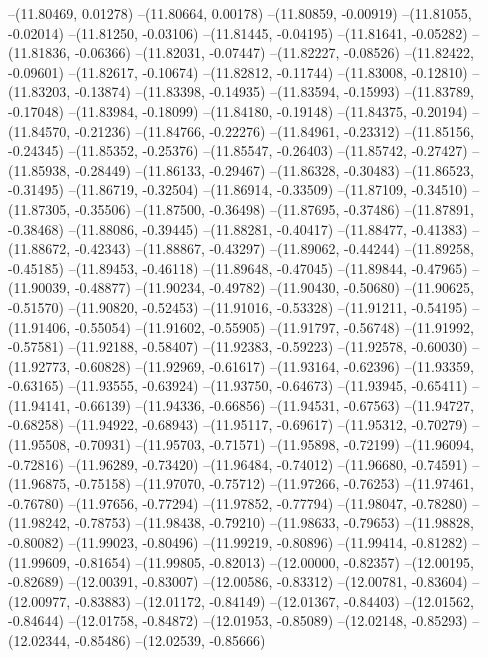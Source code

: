 --(11.80469, 0.01278)
--(11.80664, 0.00178)
--(11.80859, -0.00919)
--(11.81055, -0.02014)
--(11.81250, -0.03106)
--(11.81445, -0.04195)
--(11.81641, -0.05282)
--(11.81836, -0.06366)
--(11.82031, -0.07447)
--(11.82227, -0.08526)
--(11.82422, -0.09601)
--(11.82617, -0.10674)
--(11.82812, -0.11744)
--(11.83008, -0.12810)
--(11.83203, -0.13874)
--(11.83398, -0.14935)
--(11.83594, -0.15993)
--(11.83789, -0.17048)
--(11.83984, -0.18099)
--(11.84180, -0.19148)
--(11.84375, -0.20194)
--(11.84570, -0.21236)
--(11.84766, -0.22276)
--(11.84961, -0.23312)
--(11.85156, -0.24345)
--(11.85352, -0.25376)
--(11.85547, -0.26403)
--(11.85742, -0.27427)
--(11.85938, -0.28449)
--(11.86133, -0.29467)
--(11.86328, -0.30483)
--(11.86523, -0.31495)
--(11.86719, -0.32504)
--(11.86914, -0.33509)
--(11.87109, -0.34510)
--(11.87305, -0.35506)
--(11.87500, -0.36498)
--(11.87695, -0.37486)
--(11.87891, -0.38468)
--(11.88086, -0.39445)
--(11.88281, -0.40417)
--(11.88477, -0.41383)
--(11.88672, -0.42343)
--(11.88867, -0.43297)
--(11.89062, -0.44244)
--(11.89258, -0.45185)
--(11.89453, -0.46118)
--(11.89648, -0.47045)
--(11.89844, -0.47965)
--(11.90039, -0.48877)
--(11.90234, -0.49782)
--(11.90430, -0.50680)
--(11.90625, -0.51570)
--(11.90820, -0.52453)
--(11.91016, -0.53328)
--(11.91211, -0.54195)
--(11.91406, -0.55054)
--(11.91602, -0.55905)
--(11.91797, -0.56748)
--(11.91992, -0.57581)
--(11.92188, -0.58407)
--(11.92383, -0.59223)
--(11.92578, -0.60030)
--(11.92773, -0.60828)
--(11.92969, -0.61617)
--(11.93164, -0.62396)
--(11.93359, -0.63165)
--(11.93555, -0.63924)
--(11.93750, -0.64673)
--(11.93945, -0.65411)
--(11.94141, -0.66139)
--(11.94336, -0.66856)
--(11.94531, -0.67563)
--(11.94727, -0.68258)
--(11.94922, -0.68943)
--(11.95117, -0.69617)
--(11.95312, -0.70279)
--(11.95508, -0.70931)
--(11.95703, -0.71571)
--(11.95898, -0.72199)
--(11.96094, -0.72816)
--(11.96289, -0.73420)
--(11.96484, -0.74012)
--(11.96680, -0.74591)
--(11.96875, -0.75158)
--(11.97070, -0.75712)
--(11.97266, -0.76253)
--(11.97461, -0.76780)
--(11.97656, -0.77294)
--(11.97852, -0.77794)
--(11.98047, -0.78280)
--(11.98242, -0.78753)
--(11.98438, -0.79210)
--(11.98633, -0.79653)
--(11.98828, -0.80082)
--(11.99023, -0.80496)
--(11.99219, -0.80896)
--(11.99414, -0.81282)
--(11.99609, -0.81654)
--(11.99805, -0.82013)
--(12.00000, -0.82357)
--(12.00195, -0.82689)
--(12.00391, -0.83007)
--(12.00586, -0.83312)
--(12.00781, -0.83604)
--(12.00977, -0.83883)
--(12.01172, -0.84149)
--(12.01367, -0.84403)
--(12.01562, -0.84644)
--(12.01758, -0.84872)
--(12.01953, -0.85089)
--(12.02148, -0.85293)
--(12.02344, -0.85486)
--(12.02539, -0.85666)
